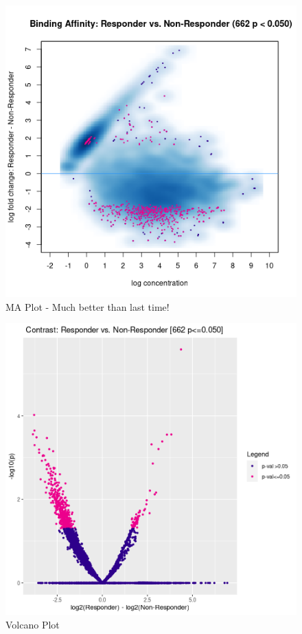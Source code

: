 \documentclass{article}
\begin{document}
\newpage

\begin{figure}
\centering
\caption{MA Plot - Much better than last time!}
\includegraphics*{figures/madata.png}
\end{figure}

\newpage

\begin{figure}
\centering
\caption{Volcano Plot}
\includegraphics*{figures/volcdata.png}
\end{figure}
\end{document}
